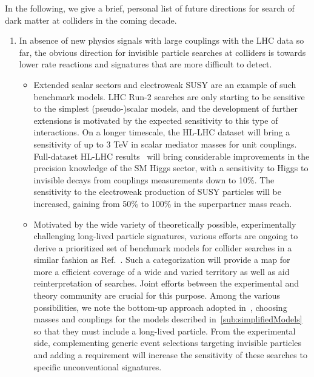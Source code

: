 In the following, we give a brief, personal list of future directions for search of dark matter at colliders in the coming decade. 

\begin{issues}
\begin{enumerate}

\item In absence of new physics signals with large couplings with the LHC data so far, the obvious direction 
for invisible particle searches at colliders is towards lower rate reactions
and signatures that are more difficult to detect. 

\begin{itemize} 

\item Extended scalar sectors and electroweak SUSY are an example of such benchmark models. LHC Run-2 searches are only starting to be sensitive to the simplest (pseudo-)scalar models, and the development of further extensions is motivated by the expected sensitivity to this type of interactions. On a longer timescale, the HL-LHC dataset will bring a sensitivity of up to 3 TeV in scalar mediator masses for unit couplings. Full-dataset HL-LHC results~\cite{Campana:2016cqm} will bring considerable improvements in the precision knowledge of the SM Higgs sector, with a sensitivity to Higgs to invisible decays from couplings measurements down to 10\%. %
The sensitivity to the electroweak production of SUSY particles will be increased, gaining from 50\% to 100\% in the superpartner mass reach. %

\item Motivated by the wide variety of theoretically possible, experimentally challenging long-lived particle signatures, various efforts are ongoing to derive a prioritized set of benchmark models for collider searches in a similar fashion as Ref.~\cite{Abercrombie:2015wmb}. Such a categorization will provide a map for more a efficient coverage of a wide and varied territory as well as aid reinterpretation of searches. Joint efforts between the experimental and theory community are crucial for this purpose. Among the various possibilities, we note the bottom-up approach adopted in~\cite{Buchmueller:2017uqu}, choosing masses and couplings for the models described in~\ref{sub:simplifiedModels} so that they must include a long-lived particle. From the experimental side, complementing  generic event selections targeting invisible particles and adding a requirement will increase the sensitivity of these searches to specific unconventional signatures. 


\end{itemize}
\end{enumerate}
\end{issues}
